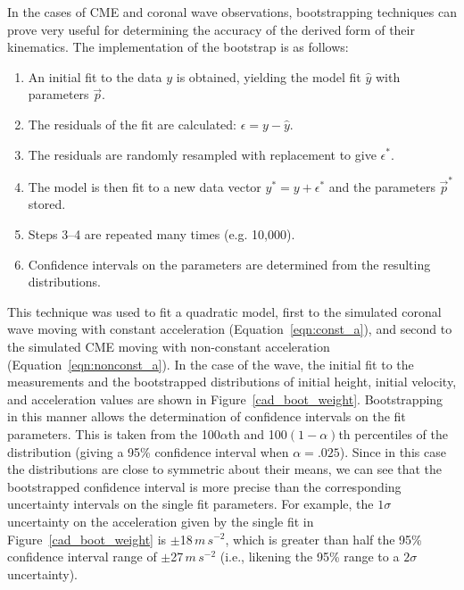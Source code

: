 \documentclass[structabstract]{aa}
\begin{document}
In the cases of CME and coronal wave observations, bootstrapping techniques can prove very useful for determining the accuracy of the derived form of their kinematics. The implementation of the bootstrap is as follows:
\begin{enumerate}
\item An initial fit to the data $y$ is obtained, yielding the model fit $\hat{y}$ with parameters $\vec{p}$.
\item The residuals of the fit are calculated: $\epsilon = y - \hat{y}$.
\item The residuals are randomly resampled with replacement to give $\epsilon^*$.
\item The model is then fit to a new data vector $y^* = y + \epsilon^*$ and the parameters $\vec{p}^*$ stored.
\item Steps 3--4 are repeated many times (e.g. 10,000).
\item Confidence intervals on the parameters are determined from the resulting distributions.
\end{enumerate}
This technique was used to fit a quadratic model, first to the simulated coronal wave moving with constant acceleration (Equation~\ref{eqn:const_a}), and second to the simulated CME moving with non-constant acceleration (Equation~\ref{eqn:nonconst_a}). In the case of the wave, the initial fit to the measurements and the bootstrapped distributions of initial height, initial velocity, and acceleration values are shown in Figure~\ref{cad_boot_weight}. Bootstrapping in this manner allows the determination of confidence intervals on the fit parameters. This is taken from the 100$\alpha$th and 100$\left(1-\alpha\right)$th percentiles of the distribution (giving a 95\% confidence interval when $\alpha=.025$). Since in this case the distributions are close to symmetric about their means, we can see that the bootstrapped confidence interval is more precise than the corresponding uncertainty intervals on the single fit parameters. For example, the $1\sigma$ uncertainty on the acceleration given by the single fit in Figure~\ref{cad_boot_weight} is $\pm$18$\,m\,s^{-2}$, which is greater than half the 95\% confidence interval range of $\pm$27$\,m\,s^{-2}$ (i.e., likening the 95\% range to a $2\sigma$ uncertainty). 
\end{document}
